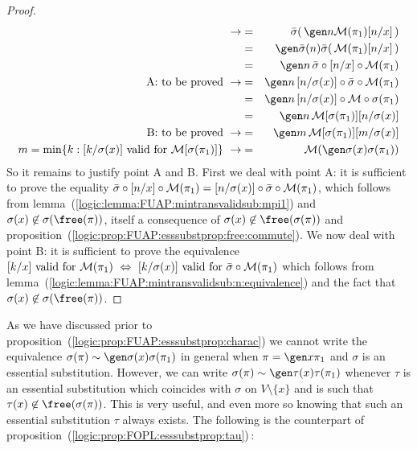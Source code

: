 \begin{proof}
\begin{eqnarray*}
    \rightarrow
    &=&\bar{\sigma}(\,\gen n{\cal M}(\pi_{1})[n/x]\,)\\
    &=&\gen \bar{\sigma}(n)\bar{\sigma}(\,{\cal
    M}(\pi_{1})[n/x]\,)\\
    &=&\gen n\,\bar{\sigma}\circ [n/x]\circ{\cal
    M}(\pi_{1})\\
    \mbox{A: to be proved}\ \rightarrow
    &=&\gen n\,[n/\sigma(x)]\circ\bar{\sigma}\circ{\cal M}(\pi_{1})\\
    &=&\gen n\,[n/\sigma(x)]\circ{\cal M}\circ\sigma(\pi_{1})\\
    &=&\gen n\,{\cal M}[\sigma(\pi_{1})][n/\sigma(x)]\\
    \mbox{B: to be proved}\ \rightarrow
    &=&\gen m\,{\cal M}[\sigma(\pi_{1})][m/\sigma(x)]\\
    \mbox{$m=\min\{k:[k/\sigma(x)]\mbox{ valid for }{\cal M}[\sigma(\pi_{1})]\}$}\
    \rightarrow
    &=&{\cal M}(\gen\sigma(x)\sigma(\pi_{1}))\\
    \end{eqnarray*}
So it remains to justify point A and B. First we deal with point A:
it is sufficient to prove the equality
$\bar{\sigma}\circ[n/x]\circ{\cal M}(\pi_{1})=
[n/\sigma(x)]\circ\bar{\sigma}\circ{\cal M}(\pi_{1})$, which follows
from lemma~(\ref{logic:lemma:FUAP:mintransvalidsub:mpi1}) and
$\sigma(x)\not\in\sigma(\free(\pi))$, itself a consequence of
$\sigma(x)\not\in\free(\sigma(\pi))$ and
proposition~(\ref{logic:prop:FUAP:esssubstprop:free:commute}). We
now deal with point B: it is sufficient to prove the equivalence
$\mbox{$[k/x]$ valid for ${\cal M}(\pi_{1})$}\ \Leftrightarrow\
\mbox{$[k/\sigma(x)]$ valid for $\bar{\sigma}\circ{\cal
M}(\pi_{1})$}$ which follows from
lemma~(\ref{logic:lemma:FUAP:mintransvalidsub:n:equivalence}) and
the fact that $\sigma(x)\not\in\sigma(\free(\pi))$.
\end{proof}

As we have discussed prior to
proposition~(\ref{logic:prop:FUAP:esssubstprop:charac}) we cannot
write the equivalence $\sigma(\pi)\sim\gen\sigma(x)\sigma(\pi_{1})$
in general when $\pi=\gen x\pi_{1}$ and $\sigma$ is an essential
substitution. However, we can write
$\sigma(\pi)\sim\gen\tau(x)\tau(\pi_{1})$ whenever $\tau$ is an
essential substitution which coincides with $\sigma$ on
$V\setminus\{x\}$ and is such that
$\tau(x)\not\in\free(\sigma(\pi))$. This is very useful, and even
more so knowing that such an essential substitution $\tau$ always
exists. The following is the counterpart of
proposition~(\ref{logic:prop:FOPL:esssubstprop:tau})\,:

